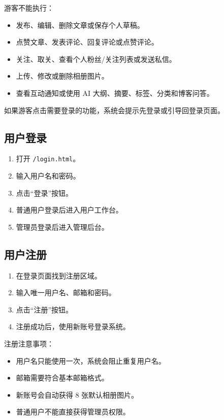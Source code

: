 \documentclass[UTF8,a4paper,12pt]{ctexart}
\newcommand{\code}[1]{\texttt{#1}}
\begin{document}
游客不能执行：

\begin{itemize}
  \item 发布、编辑、删除文章或保存个人草稿。
  \item 点赞文章、发表评论、回复评论或点赞评论。
  \item 关注、取关、查看个人粉丝/关注列表或发送私信。
  \item 上传、修改或删除相册图片。
  \item 查看互动通知或使用 AI 大纲、摘要、标签、分类和博客问答。
\end{itemize}

如果游客点击需要登录的功能，系统会提示先登录或引导回登录页面。

\subsection{用户登录}

\begin{enumerate}
  \item 打开 \code{/login.html}。
  \item 输入用户名和密码。
  \item 点击“登录”按钮。
  \item 普通用户登录后进入用户工作台。
  \item 管理员登录后进入管理后台。
\end{enumerate}

\subsection{用户注册}

\begin{enumerate}
  \item 在登录页面找到注册区域。
  \item 输入唯一用户名、邮箱和密码。
  \item 点击“注册”按钮。
  \item 注册成功后，使用新账号登录系统。
\end{enumerate}

注册注意事项：

\begin{itemize}
  \item 用户名只能使用一次，系统会阻止重复用户名。
  \item 邮箱需要符合基本邮箱格式。
  \item 新账号会自动获得 8 张默认相册图片。
  \item 普通用户不能直接获得管理员权限。
\end{itemize}
\end{document}
